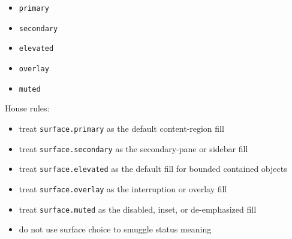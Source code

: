 \begin{itemize}
\tightlist
\item
  \texttt{p\allowbreak{}r\allowbreak{}i\allowbreak{}m\allowbreak{}a\allowbreak{}r\allowbreak{}y}
\item
  \texttt{s\allowbreak{}e\allowbreak{}c\allowbreak{}o\allowbreak{}n\allowbreak{}d\allowbreak{}a\allowbreak{}r\allowbreak{}y}
\item
  \texttt{e\allowbreak{}l\allowbreak{}e\allowbreak{}v\allowbreak{}a\allowbreak{}t\allowbreak{}e\allowbreak{}d}
\item
  \texttt{o\allowbreak{}v\allowbreak{}e\allowbreak{}r\allowbreak{}l\allowbreak{}a\allowbreak{}y}
\item
  \texttt{m\allowbreak{}u\allowbreak{}t\allowbreak{}e\allowbreak{}d}
\end{itemize}

House rules:

\begin{itemize}
\tightlist
\item
  treat \texttt{s\allowbreak{}u\allowbreak{}r\allowbreak{}f\allowbreak{}a\allowbreak{}c\allowbreak{}e\allowbreak{}.\allowbreak{}p\allowbreak{}r\allowbreak{}i\allowbreak{}m\allowbreak{}a\allowbreak{}r\allowbreak{}y} as the default content-region fill
\item
  treat \texttt{s\allowbreak{}u\allowbreak{}r\allowbreak{}f\allowbreak{}a\allowbreak{}c\allowbreak{}e\allowbreak{}.\allowbreak{}s\allowbreak{}e\allowbreak{}c\allowbreak{}o\allowbreak{}n\allowbreak{}d\allowbreak{}a\allowbreak{}r\allowbreak{}y} as the secondary-pane or sidebar fill
\item
  treat \texttt{s\allowbreak{}u\allowbreak{}r\allowbreak{}f\allowbreak{}a\allowbreak{}c\allowbreak{}e\allowbreak{}.\allowbreak{}e\allowbreak{}l\allowbreak{}e\allowbreak{}v\allowbreak{}a\allowbreak{}t\allowbreak{}e\allowbreak{}d} as the default fill for bounded contained objects
\item
  treat \texttt{s\allowbreak{}u\allowbreak{}r\allowbreak{}f\allowbreak{}a\allowbreak{}c\allowbreak{}e\allowbreak{}.\allowbreak{}o\allowbreak{}v\allowbreak{}e\allowbreak{}r\allowbreak{}l\allowbreak{}a\allowbreak{}y} as the interruption or overlay fill
\item
  treat \texttt{s\allowbreak{}u\allowbreak{}r\allowbreak{}f\allowbreak{}a\allowbreak{}c\allowbreak{}e\allowbreak{}.\allowbreak{}m\allowbreak{}u\allowbreak{}t\allowbreak{}e\allowbreak{}d} as the disabled, inset, or de-emphasized fill
\item
  do not use surface choice to smuggle status meaning
\end{itemize}

